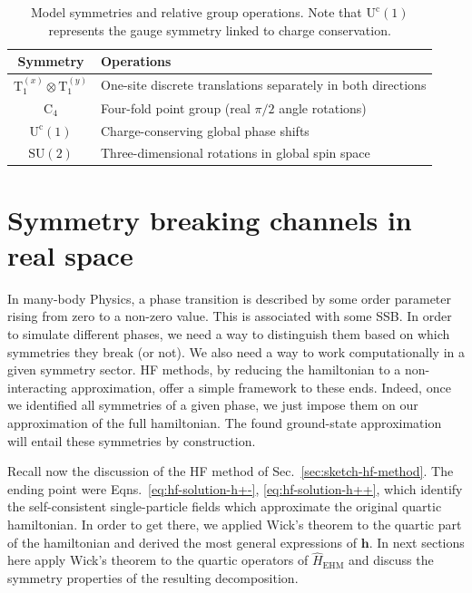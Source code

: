 \begin{table}
	\centering
	\begin{tabular}{c l}
		\textbf{Symmetry} & \textbf{Operations} \\
		\midrule
		$\mathrm{T}_1^{(x)} \otimes \mathrm{T}_1^{(y)}$ & One-site discrete translations separately in both directions \\
		$\mathrm{C}_4$ & Four-fold point group (real $\pi/2$ angle rotations) \\
		$\mathrm{U}^\mathrm{c}(1)$ & Charge-conserving global phase shifts \\
		$\mathrm{SU}(2)$ & Three-dimensional rotations in global spin space \\
		\midrule
	\end{tabular}
	\caption{Model symmetries and relative group operations. Note that $\mathrm{U}^\mathrm{c}(1)$ represents the gauge symmetry linked to charge conservation.}
	\label{tab:symmetry-groups}
\end{table}

\section{Symmetry breaking channels in real space}\label{subsec:ehm-sym-break}

In many-body Physics, a phase transition is described by some order parameter rising from zero to a non-zero value. This is associated with some SSB. In order to simulate different phases, we need a way to distinguish them based on which symmetries they break (or not). We also need a way to work computationally in a given symmetry sector. HF methods, by reducing the hamiltonian to a non-interacting approximation, offer a simple framework to these ends. Indeed, once we identified all symmetries of a given phase, we just impose them on our approximation of the full hamiltonian. The found ground-state approximation will entail these symmetries by construction.

Recall now the discussion of the HF method of Sec.~\ref{sec:sketch-hf-method}. The ending point were Eqns.~\eqref{eq:hf-solution-h+-}, \eqref{eq:hf-solution-h++}, which identify the self-consistent single-particle fields which approximate the original quartic hamiltonian. In order to get there, we applied Wick's theorem to the quartic part of the hamiltonian and derived the most general expressions of $\mathbf{h}$. In next sections here apply Wick's theorem to the quartic operators of $\hat H_\mathrm{EHM}$ and discuss the symmetry properties of the resulting decomposition.

